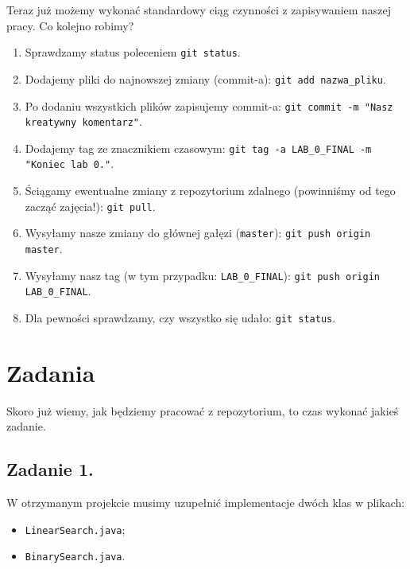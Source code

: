 \documentclass[twoside]{article}
\begin{document}
Teraz już możemy wykonać standardowy ciąg czynności z zapisywaniem naszej pracy.
Co kolejno robimy?
\begin{enumerate}
    \item Sprawdzamy status poleceniem \verb|git status|.
    
    \item Dodajemy pliki do najnowszej zmiany (commit-a): \verb|git add nazwa_pliku|.
    
    \item Po dodaniu wszystkich plików zapisujemy commit-a: \newline
            \verb|git commit -m "Nasz kreatywny komentarz"|.
            
    \item Dodajemy tag ze znacznikiem czasowym: \newline
            \verb|git tag -a LAB_0_FINAL -m "Koniec lab 0."|.
            
    \item Ściągamy ewentualne zmiany z repozytorium zdalnego
            (powinniśmy od tego zacząć zajęcia!): \verb|git pull|.
            
    \item Wysyłamy nasze zmiany do głównej gałęzi (\verb|master|): \newline
            \verb|git push origin master|.
            
    \item Wysyłamy nasz tag (w tym przypadku: \verb|LAB_0_FINAL|): \newline
            \verb|git push origin LAB_0_FINAL|.
            
    \item Dla pewności sprawdzamy, czy wszystko się udało: \verb|git status|.
\end{enumerate}

\section{Zadania}

Skoro już wiemy, jak będziemy pracować z repozytorium, to czas wykonać jakieś zadanie.

\subsection{Zadanie 1.}

W otrzymanym projekcie musimy uzupełnić implementacje dwóch klas w plikach:
\begin{itemize}
    \item \verb|LinearSearch.java|;
    \item \verb|BinarySearch.java|.
\end{itemize}
\end{document}
